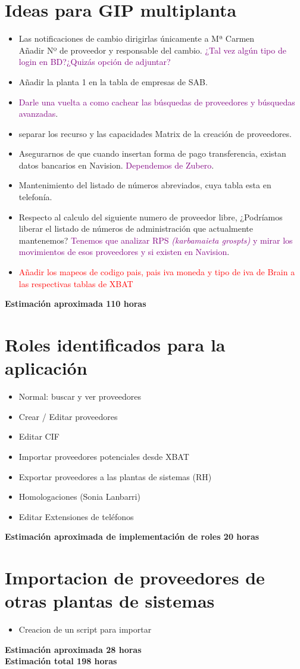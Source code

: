 \documentclass[12pt]{article}
\begin{document}
\section {Ideas para GIP multiplanta}
\begin{itemize}
\item Las notificaciones de cambio dirigirlas únicamente a Mª Carmen\\
  Añadir Nº de proveedor y responsable del cambio. \textcolor{purple}{¿Tal vez algún tipo de login en BD?¿Quizás opción de adjuntar?}
\item Añadir la planta 1 en la tabla de empresas de SAB. 
\item \textcolor{purple}{Darle una vuelta a como cachear las búsquedas de proveedores y búsquedas avanzadas}.
\item separar los recurso y las capacidades Matrix de la creación de proveedores.
\item Asegurarnos de que cuando insertan forma de pago transferencia, existan datos bancarios en Navision. \textcolor{purple}{Dependemos de Zubero}.
\item Mantenimiento del listado de números abreviados, cuya tabla esta en telefonía.
\item Respecto al calculo del siguiente numero de proveedor libre, 
  ¿Podríamos liberar el listado de números de administración que actualmente mantenemos? \textcolor{purple}{Tenemos que analizar RPS \textit{(karbamaieta grospts)} y mirar los movimientos de esos proveedores y si existen en Navision}.
\item \textcolor{red}{Añadir los mapeos de codigo pais, pais iva moneda y tipo de iva de Brain a las respectivas tablas de XBAT}
\end{itemize}
\textbf{Estimación aproximada 110 horas}
\section {Roles identificados para la aplicación}
\begin{itemize}
\item Normal: buscar y ver proveedores
\item Crear / Editar proveedores
\item Editar CIF
\item Importar proveedores potenciales desde XBAT
\item Exportar proveedores a las plantas de sistemas (RH)
\item Homologaciones (Sonia Lanbarri)
\item Editar Extensiones de teléfonos 
\end{itemize}
\textbf{Estimación aproximada de implementación de roles 20 horas}
\section {Importacion de proveedores de otras plantas de sistemas}
\begin{itemize}
  \item Creacion de un script para importar 
\end{itemize}
\textbf{Estimación aproximada 28 horas} \\

\textbf{Estimación total 198 horas}
\end{document}

